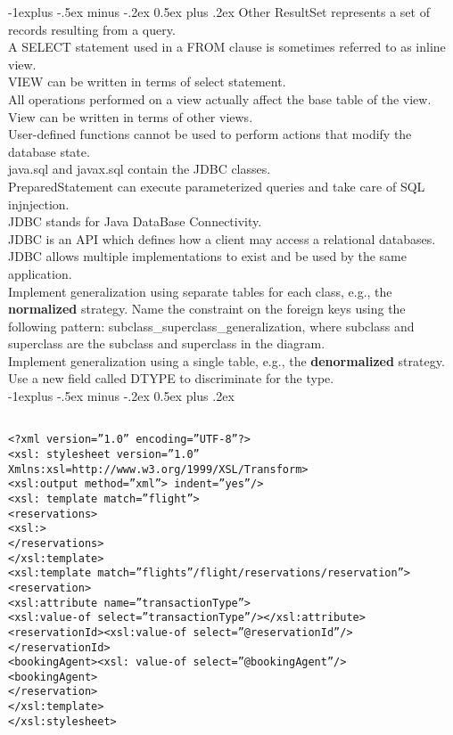 \documentclass[10pt,landscape]{article}
\makeatletter
\renewcommand{\subsection}{\@startsection{subsection}{2}{0mm}%
                                {-1explus -.5ex minus -.2ex}%
                                {0.5ex plus .2ex}%
                                {\normalfont\normalsize\bfseries}}
\makeatother
\begin{document}
\begin{multicols}{3}
\subsection{Other}
ResultSet represents a set of records resulting from a query.\\
A SELECT statement used in a FROM clause is sometimes referred to as inline view.\\
VIEW can be written in terms of select statement.\\
All operations performed on a view actually affect the base table of the view.\\
View can be written in terms of other views.\\
User-defined functions cannot be used to perform actions that modify the database state.\\
java.sql and javax.sql contain the JDBC classes.\\
PreparedStatement can execute parameterized queries and take care of SQL injnjection.\\
JDBC stands for Java DataBase Connectivity.\\
JDBC is an API which defines how a client may access a relational databases.\\
JDBC allows multiple implementations to exist and be used by the same application.\\
Implement generalization using separate tables for each class, e.g., the \textbf{normalized }strategy. Name the constraint on the foreign keys using the following pattern: subclass\_superclass\_generalization, where subclass and superclass are the subclass and superclass in the diagram.\\
Implement generalization using a single table, e.g., the \textbf{denormalized} strategy. Use a new field called DTYPE to discriminate for the type.\\
\subsection{}
\begin{lstlisting}

<?xml version=”1.0” encoding=”UTF-8”?>
<xsl: stylesheet version=”1.0”
Xmlns:xsl=http://www.w3.org/1999/XSL/Transform>
<xsl:output method=”xml”> indent=”yes”/>
<xsl: template match=”flight”>
<reservations>
<xsl:>
</reservations>
</xsl:template>
<xsl:template match=”flights”/flight/reservations/reservation”>
<reservation>
<xsl:attribute name=”transactionType”>
<xsl:value-of select=”transactionType”/></xsl:attribute>
<reservationId><xsl:value-of select=”@reservationId”/>
</reservationId>
<bookingAgent><xsl: value-of select=”@bookingAgent”/>
<bookingAgent>
</reservation>
</xsl:template>
</xsl:stylesheet>


\end{lstlisting}
\end{multicols}
\end{document}
